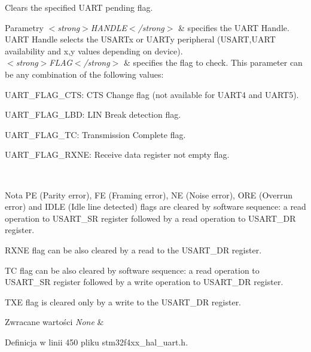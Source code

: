 Clears the specified U\+A\+RT pending flag. 


\begin{DoxyParams}{Parametry}
{\em $<$strong$>$\+H\+A\+N\+D\+L\+E$<$/strong$>$} & specifies the U\+A\+RT Handle. U\+A\+RT Handle selects the U\+S\+A\+R\+Tx or U\+A\+R\+Ty peripheral (U\+S\+A\+RT,U\+A\+RT availability and x,y values depending on device). \\
\hline
{\em $<$strong$>$\+F\+L\+A\+G$<$/strong$>$} & specifies the flag to check. This parameter can be any combination of the following values\+: \begin{DoxyItemize}
\item U\+A\+R\+T\+\_\+\+F\+L\+A\+G\+\_\+\+C\+TS\+: C\+TS Change flag (not available for U\+A\+R\+T4 and U\+A\+R\+T5). \item U\+A\+R\+T\+\_\+\+F\+L\+A\+G\+\_\+\+L\+BD\+: L\+IN Break detection flag. \item U\+A\+R\+T\+\_\+\+F\+L\+A\+G\+\_\+\+TC\+: Transmission Complete flag. \item U\+A\+R\+T\+\_\+\+F\+L\+A\+G\+\_\+\+R\+X\+NE\+: Receive data register not empty flag.\end{DoxyItemize}
\\
\hline
\end{DoxyParams}
\begin{DoxyNote}{Nota}
PE (Parity error), FE (Framing error), NE (Noise error), O\+RE (Overrun error) and I\+D\+LE (Idle line detected) flags are cleared by software sequence\+: a read operation to U\+S\+A\+R\+T\+\_\+\+SR register followed by a read operation to U\+S\+A\+R\+T\+\_\+\+DR register. 

R\+X\+NE flag can be also cleared by a read to the U\+S\+A\+R\+T\+\_\+\+DR register. 

TC flag can be also cleared by software sequence\+: a read operation to U\+S\+A\+R\+T\+\_\+\+SR register followed by a write operation to U\+S\+A\+R\+T\+\_\+\+DR register. 

T\+XE flag is cleared only by a write to the U\+S\+A\+R\+T\+\_\+\+DR register.
\end{DoxyNote}

\begin{DoxyRetVals}{Zwracane wartości}
{\em None} & \\
\hline
\end{DoxyRetVals}


Definicja w linii 450 pliku stm32f4xx\+\_\+hal\+\_\+uart.\+h.

\mbox{\label{group___u_a_r_t___exported___macros_ga1345aa0af53d82269b13835c225e91d0}} 
